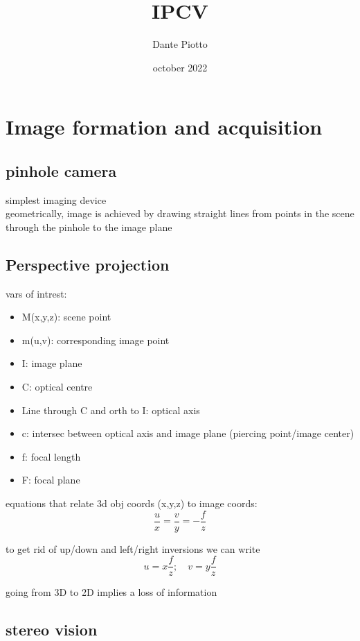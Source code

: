 \documentclass{article}
\title{IPCV}
\author{Dante Piotto}
\date{october 2022}
\begin{document}
\maketitle
\tableofcontents
\newpage
\section{Image formation and acquisition}

\subsection{pinhole camera}
simplest imaging device\\
geometrically, image is achieved by drawing straight lines from points in the scene through the pinhole to the image plane

\subsection{Perspective projection}
vars of intrest:
\begin{itemize}
	\item M(x,y,z): scene point
	\item m(u,v): corresponding image point
	\item I: image plane
	\item C: optical centre
	\item Line through C and orth to I: optical axis
	\item c: intersec between optical axis and image plane (piercing point/image center)
	\item f: focal length
	\item F: focal plane
\end{itemize}

equations that relate 3d obj coords (x,y,z) to image coords:
\begin{equation}
	\frac{u}{x} = \frac{v}{y}=- \frac{f}{z}
\end{equation}

to get rid of up/down and left/right inversions we can write
\begin{equation}
		u=  x \frac{f}{z}; \quad v=y \frac{f}{z}
\end{equation}

going from 3D to 2D implies a loss of information

\subsection{stereo vision}
\end{document}
